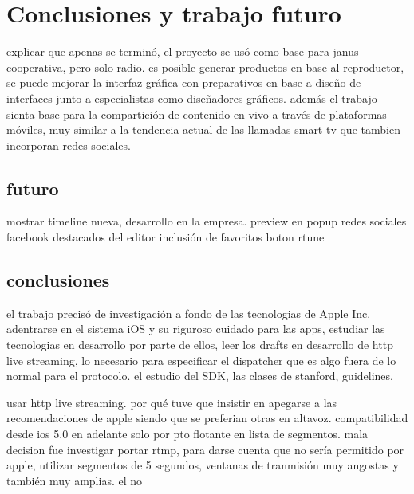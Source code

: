 
\chapter{Conclusiones y trabajo futuro}
explicar que apenas se terminó, el proyecto se usó como base para janus cooperativa, pero solo radio.
es posible generar productos en base al reproductor, se puede mejorar la interfaz gráfica con preparativos en base a diseño de interfaces junto a especialistas como diseñadores gráficos.
además el trabajo sienta base para la compartición de contenido en vivo a través de plataformas móviles, muy similar a la tendencia actual de las llamadas smart tv que tambien incorporan redes sociales.



	\section{futuro}
	mostrar timeline nueva, desarrollo en la empresa.
	preview en popup
	redes sociales facebook
	destacados del editor
	inclusión de favoritos
	boton rtune
	
	
	\section{conclusiones}
	el trabajo precisó de investigación a fondo de las tecnologias de Apple Inc. adentrarse en el sistema iOS y su riguroso cuidado para las apps, estudiar las tecnologias en desarrollo por parte de ellos, leer los drafts en desarrollo de http live streaming, lo necesario para especificar el dispatcher que es algo fuera de lo normal para el protocolo.
	el estudio del SDK, las clases de stanford, guidelines.

	usar http live streaming.
	por qué tuve que insistir en apegarse a las recomendaciones de apple siendo que se preferian otras en altavoz.
	compatibilidad desde ios 5.0 en adelante	solo por pto flotante en lista de segmentos.
	mala decision fue investigar portar rtmp, para darse cuenta que no sería permitido por apple, utilizar segmentos de 5 segundos, ventanas de tranmisión muy angostas y también muy amplias. el no 
	
		
	
	
